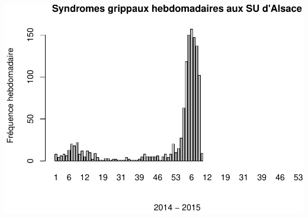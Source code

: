 \documentclass[]{article}
\begin{document}
\includegraphics{dp_files/figure-latex/grippe2-5.pdf}
\end{document}
